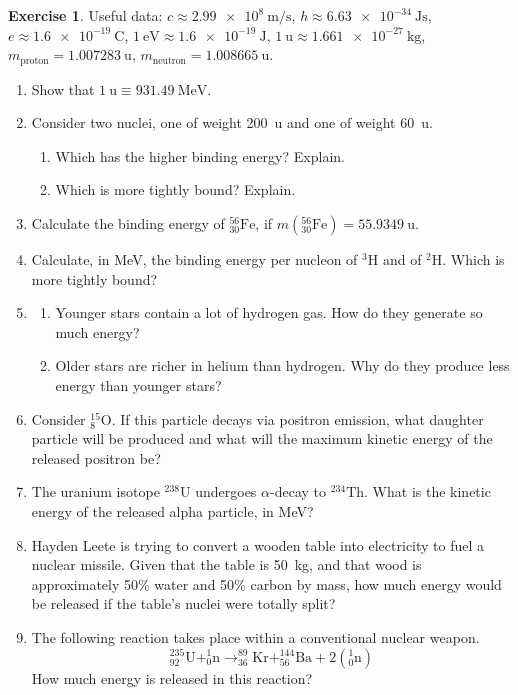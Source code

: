 \documentclass[a4paper]{amsbook}
\theoremstyle{definition}
\newtheorem{exercise}{Exercise}
\numberwithin{exercise}{chapter}
\numberwithin{exercise}{chapter}
\begin{document}
\begin{exercise}
  Useful data: $ c \approx \SI{2.99e8}{\metre\per\second} $, $ h \approx \SI{6.63e-34}{\joule\second} $,
  $ e \approx \SI{1.6e-19}{\coulomb} $, $ \SI{1}{\electronvolt} \approx \SI{1.6e-19}{\joule} $, $ \SI{1}{\amu} \approx \SI{1.661e-27}{\kilo\gram} $,
  $ m_\text{proton} = \SI{1.007283}{\amu} $, $ m_\text{neutron} = \SI{1.008665}{\amu} $.

  \begin{enumerate}
    \item Show that $ \SI{1}{\amu} \equiv \SI{931.49}{\mega\electronvolt} $.
    \item Consider two nuclei, one of weight \SI{200}{\amu} and one of weight \SI{60}{\amu}.
      \begin{enumerate}
        \item Which has the higher binding energy? Explain.
        \item Which is more tightly bound? Explain.
      \end{enumerate}
    \item Calculate the binding energy of $ ^{56}_{30}\mathrm{Fe} $, if $ m(^{56}_{30}\mathrm{Fe}) = \SI{55.9349}{\amu} $.
    \item Calculate, in \si{\mega\electronvolt}, the binding energy per nucleon of $ ^3\mathrm{H} $ and of $ ^2\mathrm{H} $.
              Which is more tightly bound?
    \item
      \begin{enumerate}
        \item Younger stars contain a lot of hydrogen gas. How do they generate so much energy?
        \item Older stars are richer in helium than hydrogen. Why do they produce less energy than younger stars?
      \end{enumerate}
    \item Consider $ ^{15}_{8}\mathrm{O} $. If this particle decays via positron emission, what daughter
              particle will be produced and what will the maximum kinetic energy of the released positron be?
    \item The uranium isotope $ ^{238}\mathrm{U} $ undergoes $ \alpha$-decay to $ ^{234}\mathrm{Th} $. What
              is the kinetic energy of the released alpha particle, in \si{\mega\electronvolt}?
    \item Hayden Leete is trying to convert a wooden table into electricity to fuel a nuclear missile. Given
              that the table is \SI{50}{\kg}, and that wood is approximately 50\% water and 50\% carbon by mass,
              how much energy would be released if the table's nuclei were totally split?
    \item The following reaction takes place within a conventional nuclear weapon.
              \begin{displaymath}
                ^{235}_{92}\mathrm{U} + ^1_0\mathrm{n} \rightarrow ^{89}_{36}\mathrm{Kr} + ^{144}_{56}\mathrm{Ba} + 2\left(^{1}_0\mathrm{n}\right)
              \end{displaymath}
              How much energy is released in this reaction?



\end{enumerate}
\end{exercise}
\end{document}
